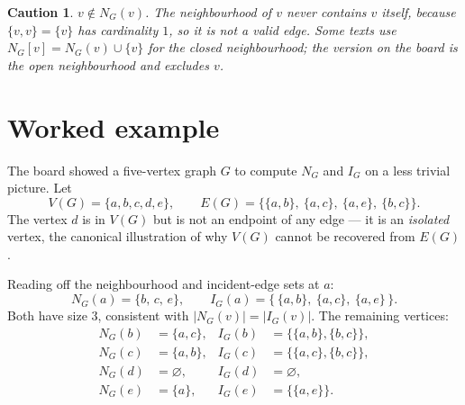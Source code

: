 \documentclass[11pt]{article}
\theoremstyle{defstyle}
\theoremstyle{thmstyle}
\theoremstyle{notstyle}
\theoremstyle{cautionstyle}
\newtheorem*{caution}{Caution}
\begin{document}
\begin{cautionbox}
\begin{caution}
$v \notin N_G(v)$. The neighbourhood of $v$ never contains $v$ itself,
because $\{v, v\} = \{v\}$ has cardinality $1$, so it is not a valid edge.
Some texts use $N_G[v] = N_G(v) \cup \{v\}$ for the \emph{closed}
neighbourhood; the version on the board is the \emph{open} neighbourhood
and excludes $v$.
\end{caution}
\end{cautionbox}

\section{Worked example}

The board showed a five-vertex graph $G$ to compute $N_G$ and $I_G$ on a
less trivial picture. Let
\[
  V(G) = \{a, b, c, d, e\}, \qquad
  E(G) = \bigl\{ \{a,b\},\ \{a,c\},\ \{a,e\},\ \{b,c\} \bigr\}.
\]
The vertex $d$ is in $V(G)$ but is not an endpoint of any edge --- it is an
\emph{isolated} vertex, the canonical illustration of why $V(G)$ cannot be
recovered from $E(G)$.

\begin{center}
\end{center}

\noindent
Reading off the neighbourhood and incident-edge sets at $a$:
\[
  N_G(a) = \{b,\, c,\, e\},
  \qquad
  I_G(a) = \bigl\{\, \{a,b\},\ \{a,c\},\ \{a,e\} \,\bigr\}.
\]
Both have size $3$, consistent with $|N_G(v)| = |I_G(v)|$. The remaining
vertices:
\begin{align*}
  N_G(b) &= \{a, c\},      & I_G(b) &= \bigl\{\{a,b\},\{b,c\}\bigr\}, \\
  N_G(c) &= \{a, b\},      & I_G(c) &= \bigl\{\{a,c\},\{b,c\}\bigr\}, \\
  N_G(d) &= \varnothing,   & I_G(d) &= \varnothing, \\
  N_G(e) &= \{a\},         & I_G(e) &= \bigl\{\{a,e\}\bigr\}.
\end{align*}
\end{document}

